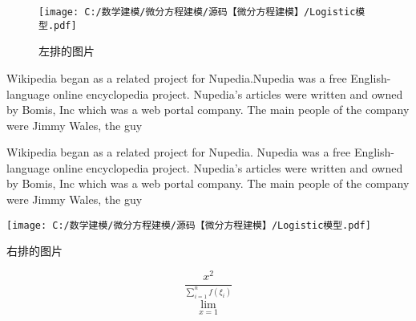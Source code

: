 \documentclass[fontset=windows]{article}
\begin{document}
	\begin{wrapfigure}{l}{0pt}
		\centering
		\texttt{[image: C:/数学建模/微分方程建模/源码【微分方程建模】/Logistic模型.pdf]}
		\caption{左排的图片}
	\end{wrapfigure}
	Wikipedia began as a related project for Nupedia.Nupedia was a free English-language online encyclopedia project.
	Nupedia's articles were written and owned by Bomis, Inc which was a web portal company. 
	The main people of the company were Jimmy Wales, the guy 
	
	\vspace{8em}
	\begin{minipage}{0.5\linewidth}
		Wikipedia began as a related project for Nupedia. Nupedia was a free English-language online encyclopedia project.
		Nupedia's articles were written and owned by Bomis, Inc which was a web portal company. 
		The main people of the company were Jimmy Wales, the guy 
	\end{minipage}
	\hfill %
	\begin{minipage}{0.5\linewidth}
		\texttt{[image: C:/数学建模/微分方程建模/源码【微分方程建模】/Logistic模型.pdf]}
		
		右排的图片
	\end{minipage}

	$$\frac{x^2}{\lim_{x=1}^{\sum_{i=1}^{n}{f(\xi_i)}}}$$



	
\end{document}
